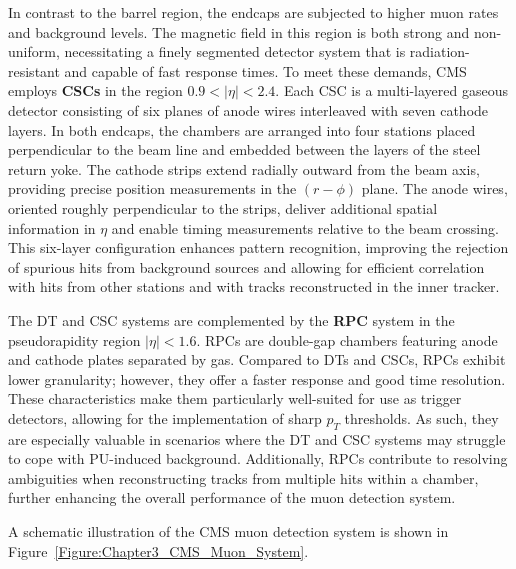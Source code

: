 In contrast to the barrel region, the endcaps are subjected to higher muon rates and background levels. The magnetic field in this region is both strong and non-uniform, necessitating a finely segmented detector system that is radiation-resistant and capable of fast response times. To meet these demands, CMS employs \textbf{\ac{CSCs}} in the region $0.9 < |\eta|<2.4$. Each CSC is a multi-layered gaseous detector consisting of six planes of anode wires interleaved with seven cathode layers. In both endcaps, the chambers are arranged into four stations placed perpendicular to the beam line and embedded between the layers of the steel return yoke. The cathode strips extend radially outward from the beam axis, providing precise position measurements in the $(r-\phi)$ plane. The anode wires, oriented roughly perpendicular to the strips, deliver additional spatial information in $\eta$ and enable timing measurements relative to the beam crossing. This six-layer configuration enhances pattern recognition, improving the rejection of spurious hits from background sources and allowing for efficient correlation with hits from other stations and with tracks reconstructed in the inner tracker.

The DT and CSC systems are complemented by the \textbf{\ac{RPC}} system in the pseudorapidity region $|\eta| < 1.6$. RPCs are double-gap chambers featuring anode and cathode plates separated by gas. Compared to DTs and CSCs, RPCs exhibit lower granularity; however, they offer a faster response and good time resolution. These characteristics make them particularly well-suited for use as trigger detectors, allowing for the implementation of sharp $p_T$ thresholds. As such, they are especially valuable in scenarios where the DT and CSC systems may struggle to cope with PU-induced background. Additionally, RPCs contribute to resolving ambiguities when reconstructing tracks from multiple hits within a chamber, further enhancing the overall performance of the muon detection system.

A schematic illustration of the CMS muon detection system is shown in Figure~\ref{Figure:Chapter3_CMS_Muon_System}.

